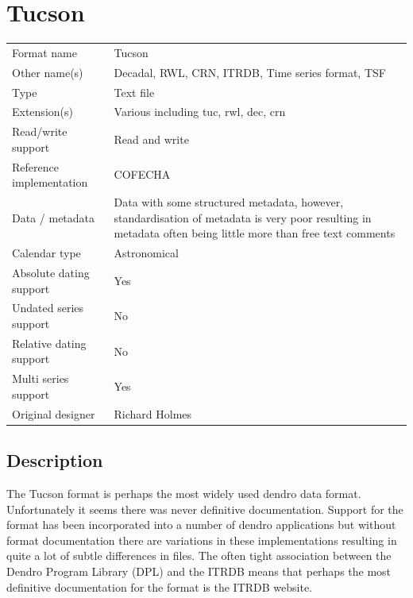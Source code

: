 \chapter{Tucson}
\begin{table}[htbp]
\label{summary:tucson}
\begin{center}
\begin{tabular*}{15cm}{ l @{\extracolsep{\fill}} p{9cm} }
  \toprule

Format name     	 & Tucson\\
Other name(s)      	 & Decadal, RWL, CRN, ITRDB, Time series format, TSF\\
Type      	 	 & Text file\\
Extension(s)      	 & Various including tuc, rwl, dec, crn\\
Read/write support     	 & Read and write\\
Reference implementation & COFECHA\\
Data / metadata      	 & Data with some structured metadata, however, standardisation of metadata is very poor resulting in metadata often being little more than free text comments\\
Calendar type		 & Astronomical\\
Absolute dating support	 & Yes\\
Undated series support   & No\\
Relative dating support  & No\\
Multi series support	 & Yes\\
Original designer	 & Richard Holmes\\

\bottomrule
\end{tabular*}
\end{center}
\end{table}

\section{Description}
The Tucson format is perhaps the most widely used dendro data format. Unfortunately it seems there was never definitive documentation. Support for the format has been incorporated into a number of dendro applications but without format documentation there are variations in these implementations resulting in quite a lot of subtle differences in files. The often tight association between the Dendro Program Library (DPL) and the ITRDB means that perhaps the most definitive documentation for the format is the ITRDB website.

